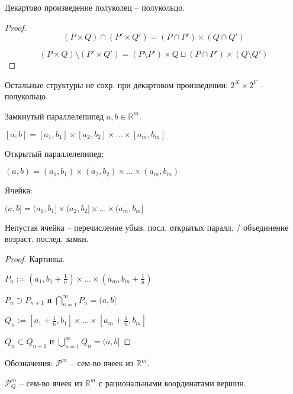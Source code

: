 \begin{theorem}
    Декартово произведение полуколец -- полукольцо.
\end{theorem}
\begin{proof}
    
    $$(P \times Q) \cap (P' \times Q') = (P \cap P') \times (Q \cap Q')$$

    $$(P \times Q) \setminus (P' \times Q') = (P \setminus P') \times Q \sqcup (P \cap P') \times (Q \setminus Q')$$
\end{proof}

\begin{remark}
    Остальные структуры не сохр. при декартовом произведении: $2^X \times 2^Y$ -- полукольцо.
\end{remark}

\begin{definition}
    Замкнутый параллелепипед $a, b \in \mathbb{R}^m$.

    $[a, b] = [a_1, b_1] \times [a_2, b_2] \times \dots \times [a_m, b_m]$

    Открытый параллелепипед:

    $(a, b) = (a_1, b_1) \times (a_2, b_2) \times \dots \times (a_m, b_m)$

    Ячейка:
    
    $(a, b] = (a_1, b_1] \times (a_2, b_2] \times \dots \times (a_m, b_m]$
\end{definition}

\begin{theorem}
    Непустая ячейка -- перечисление убыв. посл. открытых паралл. / объединение возраст. послед. замкн.
\end{theorem}

\begin{proof}
    Картинка.


    $P_n := (a_1, b_1 + \frac{1}{n}) \times \dots \times (a_m, b_m + \frac{1}{n})$

    $P_n \supset P_{n+1}$ и $\bigcap_{n=1}^{\infty}P_n = (a, b]$

    $Q_n := [a_1 + \frac{1}{n}, b_1] \times \dots \times [a_m + \frac{1}{n}, b_m]$

    $Q_n \subset Q_{n+1}$ и $\bigcup_{n=1}^{\infty}Q_n = (a, b]$ 
\end{proof}

Обозначения: $\mathcal{P}^m$ -- сем-во ячеек из $\mathbb{R}^m$.

$\mathcal{P}_{Q}^{m}$ -- сем-во ячеек из $\mathbb{R}^m$ с рациональными координатами вершин.

